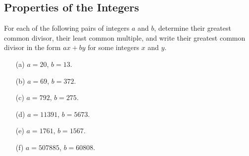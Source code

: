 \subsection{Properties of the Integers}

\begin{exercise}
	For each of the following pairs of integers $a$ and $b$, determine their greatest common divisor, their least common multiple, and write their greatest common divisor in the form $ax + by$ for some integers $x$ and $y$.
	\begin{enumerate}
		\item[(a)] $a = 20$, $b = 13$.
		\item[(b)] $a = 69$, $b = 372$.
		\item[(c)] $a = 792$, $b = 275$.
		\item[(d)] $a = 11391$, $b = 5673$.
		\item[(e)] $a = 1761$, $b = 1567$.
		\item[(f)] $a = 507885$, $b = 60808$.
	\end{enumerate}
\end{exercise}

